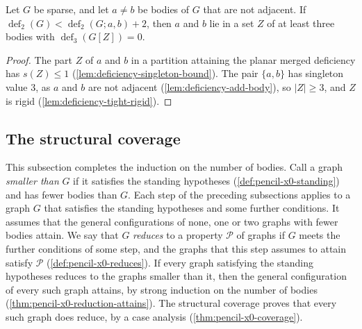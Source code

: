 \begin{lemma}
  \label{lem:deficiency-two-body-chain}
  \leanok
  Let $G$ be sparse, and let $a \neq b$ be bodies of $G$ that are not
  adjacent. If $\operatorname{def}_2(G) < \operatorname{def}_2(G; a, b) +
  2$, then $a$ and $b$ lie in a set $Z$ of at least three bodies with
  $\operatorname{def}_3(G[Z]) = 0$.
\end{lemma}
\begin{proof}
  \leanok
  The part $Z$ of $a$ and $b$ in a partition attaining the planar
  merged deficiency has $s(Z) \le 1$
  (\cref{lem:deficiency-singleton-bound}). The pair $\{a, b\}$ has
  singleton value $3$, as $a$ and $b$ are not adjacent
  (\cref{lem:deficiency-add-body}), so $|Z| \ge 3$, and $Z$ is rigid
  (\cref{lem:deficiency-tight-rigid}).
\end{proof}

\subsection{The structural coverage}
\label{sec:main-component-coverage}

This subsection completes the induction on the number of bodies. Call a
graph \emph{smaller than} $G$ if it satisfies the standing hypotheses
(\cref{def:pencil-x0-standing}) and has fewer bodies than $G$. Each step
of the preceding subsections applies to a graph $G$ that satisfies the
standing hypotheses and some further conditions. It assumes that the
general configurations of none, one or two graphs with fewer bodies
attain. We say that $G$ \emph{reduces} to a property $\mathcal P$ of
graphs if $G$ meets the further conditions of some step, and the graphs
that this step assumes to attain satisfy $\mathcal P$
(\cref{def:pencil-x0-reduces}). If every graph satisfying the standing
hypotheses reduces to the graphs smaller than it, then the general
configuration of every such graph attains, by strong induction on the
number of bodies (\cref{thm:pencil-x0-reduction-attains}). The
structural coverage proves that every such graph does reduce, by a case
analysis (\cref{thm:pencil-x0-coverage}).

